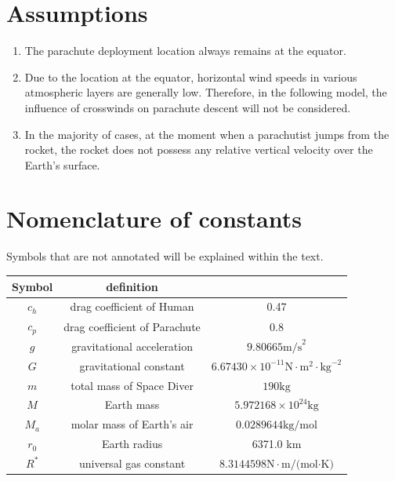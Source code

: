 \documentclass[12pt]{article}
\begin{document}
\section{Assumptions}

\begin{enumerate}
    \item The parachute deployment location always remains at the equator.
    \item Due to the location at the equator, horizontal wind speeds in various atmospheric layers are generally low. 
    Therefore, in the following model, the influence of crosswinds on parachute descent will not be considered.
    \item In the majority of cases, at the moment when a parachutist 
    jumps from the rocket, the rocket does not possess any relative 
    vertical velocity over the Earth's surface.
\end{enumerate}

\section{Nomenclature of constants}
Symbols that are not annotated will be explained within the text.

\begin{table}[h]
    \centering
    \begin{tabular}{c c c}
    \toprule
    Symbol & definition \\
    \midrule
    $c_h$ & drag coefficient of Human  & 0.47 \\
    $c_p$ & drag coefficient of Parachute & 0.8 \\
    $g$ & gravitational acceleration & $9.80665 \text{m/s}^2$\\
    $G$ & gravitational constant & $6.67430\times 10^{-11} \text{N}\cdot\text{m}^2\cdot\text{kg}^{-2}$\\
    $m$ & total mass of Space Diver & $190\text{kg}$\\
    $M$ & Earth mass & $5.972168\times 10^{24} \text{kg}$\\
    $M_a$ & molar mass of Earth's air & $0.0289644 \text{kg/mol}$ \\
    $r_0$ & Earth radius & 6371.0 km \\
    $R^*$ & universal gas constant & $8.3144598 \text{N}\cdot\text{m/(mol·K)}$ \\
    \bottomrule
    \end{tabular}
\end{table}
\end{document}
